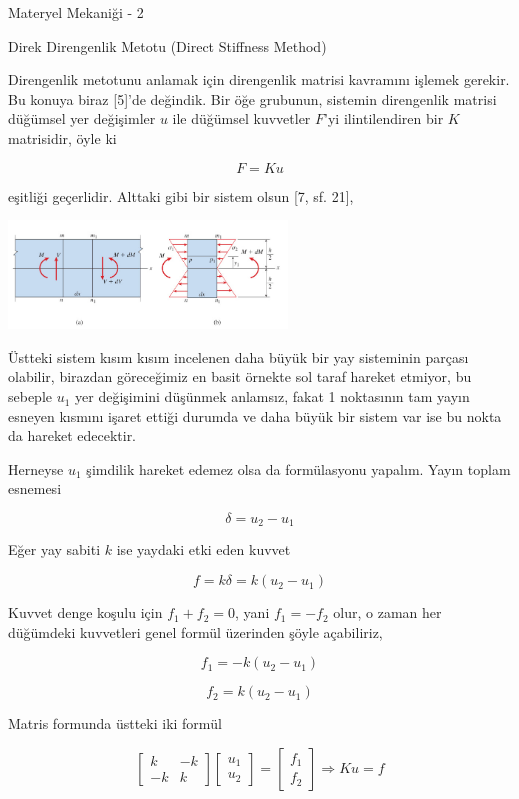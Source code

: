 \documentclass[12pt,fleqn]{article}\usepackage{../../common}
\begin{document}
Materyel Mekaniği - 2

Direk Direngenlik Metotu (Direct Stiffness Method)

Direngenlik metotunu anlamak için direngenlik matrisi kavramını işlemek
gerekir. Bu konuya biraz [5]'de değindik. Bir öğe grubunun, sistemin direngenlik
matrisi düğümsel yer değişimler $u$ ile düğümsel kuvvetler $F$'yi ilintilendiren
bir $K$ matrisidir, öyle ki

$$
F = K u
$$

eşitliği geçerlidir. Alttaki gibi bir sistem olsun [7, sf. 21],

\includegraphics[width=20em]{phy_020_strs_02_01.jpg}

Üstteki sistem kısım kısım incelenen daha büyük bir yay sisteminin parçası
olabilir, birazdan göreceğimiz en basit örnekte sol taraf hareket etmiyor, bu
sebeple $u_1$ yer değişimini düşünmek anlamsız, fakat 1 noktasının tam yayın
esneyen kısmını işaret ettiği durumda ve daha büyük bir sistem var ise bu nokta
da hareket edecektir.

Herneyse $u_1$ şimdilik hareket edemez olsa da formülasyonu yapalım. Yayın
toplam esnemesi

$$
\delta = u_2 - u_1
$$

Eğer yay sabiti $k$ ise yaydaki etki eden kuvvet

$$
f = k \delta = k (u_2 - u_1)
$$

Kuvvet denge koşulu için $f_1 + f_2  = 0$, yani $f_1 = -f_2$ olur, o zaman
her düğümdeki kuvvetleri genel formül üzerinden şöyle açabiliriz,

$$
f_1 = -k (u_2 - u_1)
$$

$$
f_2 = k(u_2 - u_1)
$$

Matris formunda üstteki iki formül

$$
\left[\begin{array}{cc}
k & -k \\ -k & k
\end{array}\right]
\left[\begin{array}{c}
u_1 \\ u_2 
\end{array}\right] =
\left[\begin{array}{c}
f_1 \\ f_2 
\end{array}\right]  \Rightarrow
Ku = f
$$
\end{document}
